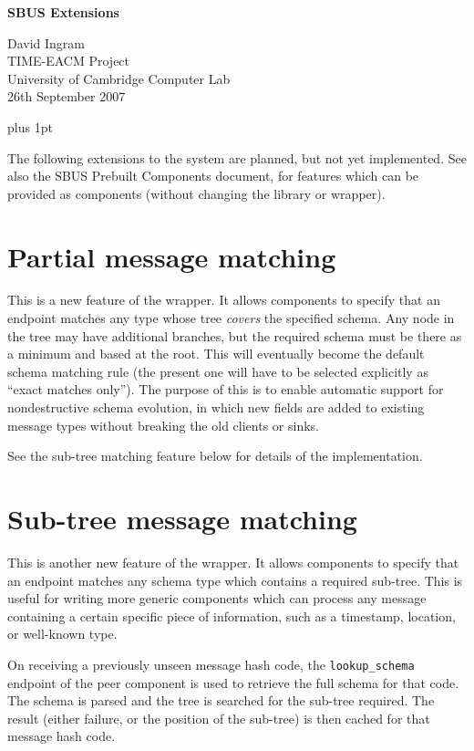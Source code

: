 \documentclass[12pt,a4paper,twoside]{article}
\renewcommand{\_}{\texttt{\symbol{95}}}
\begin{document}
\centerline{\textbf{\LARGE SBUS Extensions}}
\begin{center} \large
David Ingram\\
TIME-EACM Project\\
University of Cambridge Computer Lab\\
26th September 2007\\
\end{center}

{ \parskip 1mm plus 1pt \tableofcontents }
\pagestyle{fancy}

\vspace{1cm}
The following extensions to the system are planned, but not yet implemented.
See also the SBUS Prebuilt Components document, for features which can
be provided as components (without changing the library or wrapper).

\section{Partial message matching}

This is a new feature of the wrapper. It allows
components to specify that an endpoint matches any type whose tree
\textit{covers} the specified schema. Any node in the tree may have
additional branches, but the required schema must be there as a minimum
and based at the root. This will eventually become the default
schema matching rule (the present one will have to be selected
explicitly as ``exact matches only''). The purpose of this is to enable
automatic support for nondestructive schema evolution, in which new
fields are added to existing message types without breaking the
old clients or sinks.

See the sub-tree matching feature below for details of the implementation.

\section{Sub-tree message matching}

This is another new feature of the wrapper. It allows components to specify
that an endpoint matches any schema type which contains a required sub-tree.
This is useful for writing more generic components which can process
any message containing a certain specific piece of information, such
as a timestamp, location, or well-known type.

On receiving a previously unseen
message hash code, the \verb^lookup_schema^ endpoint of the peer component
is used to retrieve the full schema for that code.
The schema is parsed and the tree is
searched for the sub-tree required. The result (either failure,
or the position of the sub-tree) is then cached for that message
hash code.
\end{document}
